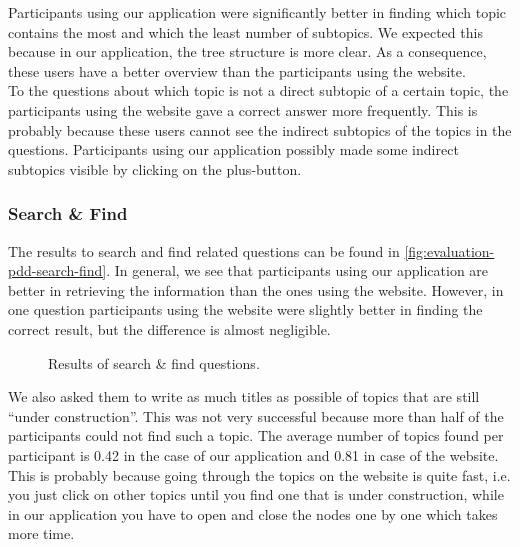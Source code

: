 Participants using our application were significantly better in finding which topic contains the most and which the least number of subtopics. We expected this because in our application, the tree structure is more clear. As a consequence, these users have a better overview than the participants using the website.\\

To the questions about which topic is not a direct subtopic of a certain topic, the participants using the website gave a correct answer more frequently. This is probably because these users cannot see the indirect subtopics of the topics in the questions. Participants using our application possibly made some indirect subtopics visible by clicking on the plus-button.

\subsubsection{Search \& Find}
The results to search and find related questions can be found in \autoref{fig:evaluation-pdd-search-find}. In general, we see that participants using our application are better in retrieving the information than the ones using the website. However, in one question participants using the website were slightly better in finding the correct result, but the difference is almost negligible.

\begin{figure}[H]
	\centering
	\caption{Results of search \& find questions.}
	\label{fig:evaluation-pdd-search-find}
\end{figure}

We also asked them to write as much titles as possible of topics that are still ``under construction''. This was not very successful because more than half of the participants could not find such a topic. The average number of topics found per participant is 0.42 in the case of our application and 0.81 in case of the website. This is probably because going through the topics on the website is quite fast, i.e. you just click on other topics until you find one that is under construction, while in our application you have to open and close the nodes one by one which takes more time.

